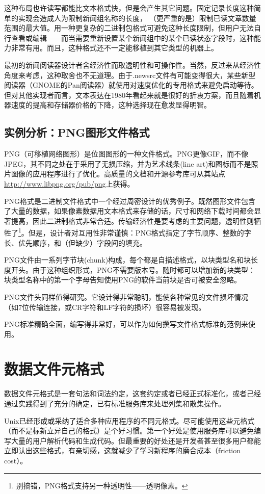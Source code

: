 \documentclass[12pt,oneside]{book}
\begin{document}
这种布局也许读写都能比文本格式快，但是会产生其它问题。固定记录长度这种简单的实现会造成人为限制新闻组名称的长度，  （更严重的是）限制已读文章数量范围的最大值。用一种更复杂的二进制包格式可避免这种长度限制，但用户无法自行查看或编辑——而当需要重新设置某个新闻组中的某个已读状态字段时，这种能力非常有用。而且，这种格式还不一定能移植到其它类型的机器上。

最初的新闻阅读器设计者舍经济性而取透明性和可操作性。当然，反过来从经济性角度来考虑，这种取舍也不无道理。由于.newsrc文件有可能变得很大，某些新型阅读器（GNOME的Pan阅读器）就使用对速度优化的专用格式来避免启动等待。但对其他实现者而言，文本表达在1980年看起来就是很好的折衷方案，而且随着机器速度的提高和存储器价格的下降，这种选择现在愈发显得明智。


\subsection{实例分析：PNG图形文件格式}
PNG（可移植网络图形）是位图图形的一种文件格式。PNG更像GIF，而不像JPEG，其不同之处在于采用了无损压缩，并为艺术线条(line art)和图标而不是照片图像的应用程序进行了优化。高质量的文档和开源参考库可从其站点\href{http://www.libpng.org/pub/png}{http://www.libpng.org/pub/png}上获得。

PNG格式是二进制文件格式中一个经过周密设计的优秀例子。既然图形文件包含了大量的数据，如果像素数据用文本格式来存储的话，尺寸和网络下载时间都会显著提高，因此二进制格式非常合适。传输经济性是要考虑的主要问题，透明性则牺牲了\footnote{别搞错，PNG格式支持另一种透明性——透明像素。}。但是，设计者对互用性非常谨慎：PNG格式指定了字节顺序、整数的字长、优先顺序，和（但缺少）字段间的填充。

PNG文件由一系列字节块(chunk)构成，每个都是自描述格式，以块类型名和块长度开头。由于这种组织形式，PNG不需要版本号。随时都可以增加新的块类型：块类型名称中的第一个字母告知使用PNG的软件当前块是否可被安全忽略。

PNG文件头同样值得研究。它设计得非常聪明，能使各种常见的文件损坏情况（如7位传输连接，或CR字符和LF字符的损坏）很容易被发现。

PNG标准精确全面，编写得非常好，可以作为如何撰写文件格式标准的范例来使用。


\section{数据文件元格式}
数据文件元格式是一套句法和词法约定，这套约定或者已经正式标准化，或者己经通过实践得到了充分的确定，已有标准服务库来处理列集和散集操作。

Unix已经形成或采纳了适合多种应用程序的不同元格式。尽可能使用这些元格式（而不是标新立异自己的格式）是个好习惯。第一个好处是使用服务库可以避免编写大量的用户解析代码和生成代码。但最重要的好处还是开发者甚至很多用户都能立即认出这些格式，有亲切感，这就减少了学习新程序的磨合成本（friction cost）。
\end{document}
